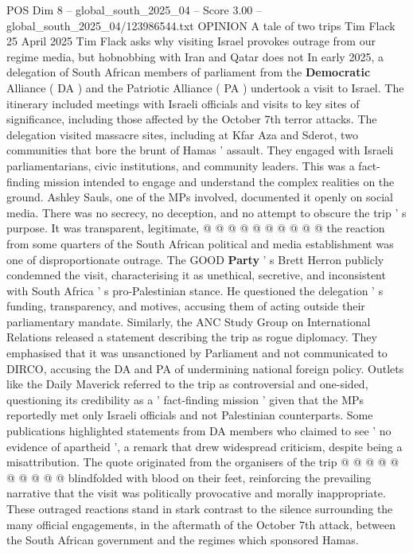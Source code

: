\begin{textsample}{POS Dim 8 – global\_south\_2025\_04 – Score 3.00 – global\_south\_2025\_04/123986544.txt}  \label{ex:f8_pos_416}
OPINION A tale of two trips Tim Flack 25 April 2025 Tim Flack asks why visiting Israel provokes outrage from our regime media, but hobnobbing with Iran and Qatar does not In early 2025, a delegation of South African members of parliament from the \textbf{Democratic} Alliance ( DA ) and the Patriotic Alliance ( PA ) undertook a visit to Israel.
The itinerary included meetings with Israeli officials and visits to key sites of significance, including those affected by the October 7th terror attacks.
The delegation visited massacre sites, including at Kfar Aza and Sderot, two communities that bore the brunt of Hamas ' assault.
They engaged with Israeli parliamentarians, civic institutions, and community leaders.
This was a fact-finding mission intended to engage and understand the complex realities on the ground.
Ashley Sauls, one of the MPs involved, documented it openly on social media.
There was no secrecy, no deception, and no attempt to obscure the trip ' s purpose.
It was transparent, legitimate, @ @ @ @ @ @ @ @ @ @ the reaction from some quarters of the South African political and media establishment was one of disproportionate outrage.
The GOOD \textbf{Party} ' s Brett Herron publicly condemned the visit, characterising it as unethical, secretive, and inconsistent with South Africa ' s pro-Palestinian stance.
He questioned the delegation ' s funding, transparency, and motives, accusing them of acting outside their parliamentary mandate.
Similarly, the ANC Study Group on International Relations released a statement describing the trip as rogue diplomacy.
They emphasised that it was unsanctioned by Parliament and not communicated to DIRCO, accusing the DA and PA of undermining national foreign policy.
Outlets like the Daily Maverick referred to the trip as controversial and one-sided, questioning its credibility as a ' fact-finding mission ' given that the MPs reportedly met only Israeli officials and not Palestinian counterparts.
Some publications highlighted statements from DA members who claimed to see ' no evidence of apartheid ', a remark that drew widespread criticism, despite being a misattribution.
The quote originated from the organisers of the trip @ @ @ @ @ @ @ @ @ @ blindfolded with blood on their feet, reinforcing the prevailing narrative that the visit was politically provocative and morally inappropriate.
These outraged reactions stand in stark contrast to the silence surrounding the many official engagements, in the aftermath of the October 7th attack, between the South African government and the regimes which sponsored Hamas.

\end{textsample}
